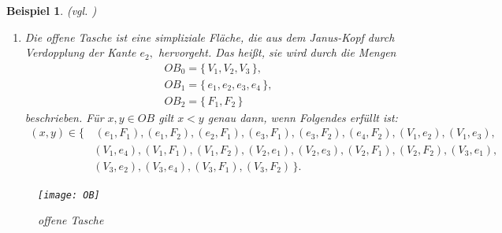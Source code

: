 \documentclass[12pt,titlepage,twoside,cleardoublepage]{article}
\theoremstyle{nummermitklammern}
\newtheorem{bsp}[temp]{Beispiel}
\newtheorem{bsp}[zahl]{Beispiel}
\numberwithin{equation}{section}
\begin{document}
\begin{bsp}{\textsc{(}vgl. \textsc{\cite{Rey})}}
\begin{enumerate}
 \begin{align*}
 &J_{0}=\{\,V_{1},V_{2},V_{3}\,\} ,\\
 &J_{1}=\{\,e_{1},e_{2},e_{3}\,\},\\
 &J_{2}=\{\, F_{1},F_{2}\,\}
\end{align*}
definiert. Für $x,y\in J$ gilt $x<y$ genau dann, wenn Folgendes erfüllt ist:
\begin{align*} 
 (x,y)\in\{&\,(e_{1},F_{1}),(e_{1},F_{2}),(e_{2},F_{1}),(e_{2},F_{2}),(e_{3},F_{1}),(e_{3},F_{2}),(V_{1},e_{2}),(V_{1},e_{3}),\\ &(V_{1},F_{1}),
  (V_{1},F_{2}),(V_{2},e_{1}),(V_{2},e_{3}),(V_{2},F_{1}),
 (V_{2},F_{2}), (V_{3},e_{1}), (V_{3},e_{2}),\\&(V_{3},F_{1}),(V_{3},F_{2}) \,\}.
 \end{align*}

\begin{figure}[H]
\begin{center}
\texttt{[image: JanusHead]}
\end{center}
\caption{Janus-Kopf}
\end{figure}
 \item 
 Die \emph{offene Tasche} ist eine simpliziale Fläche, die aus dem \emph{Janus-Kopf} durch Verdopplung der Kante $e_{2},$ hervorgeht. Das heißt, sie wird durch die Mengen
 \begin{align*}
&  OB_{0}=\{\,V_{1},V_{2},V_{3}\,\},\\
 & OB_{1}=\{\,e_{1},e_{2},e_{3},e_{4} \,\},\\
  &OB_{2}=\{\,F_{1},F_{2}\,\}
  \end{align*}
  beschrieben. Für  $x,y\in OB$ gilt $x<y$ genau dann, wenn Folgendes erfüllt ist:
   \begin{align*}
 (x,y)\in\{&\,(e_{1},F_{1}),(e_{1},F_{2}),(e_{2},F_{1}),(e_{3},F_{1}),(e_{3},F_{2}),(e_{4},F_{2}),(V_{1},e_{2}),(V_{1},e_{3}),\\ &(V_{1},e_{4}),
  (V_{1},F_{1}),(V_{1},F_{2}),(V_{2},e_{1}),(V_{2},e_{3}),
 (V_{2},F_{1}), (V_{2},F_{2}), (V_{3},e_{1}),\\&(V_{3},e_{2}),(V_{3},e_{4}),(V_{3},F_{1}),(V_3,F_2) \,\}.
 \end{align*}
 \end{enumerate}
\begin{figure}[H]
\begin{center}
\texttt{[image: OB]}
\end{center}
\caption{offene Tasche}
\end{figure}
\end{bsp}
\end{document}
